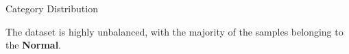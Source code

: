 \documentclass[12pt,aspectratio=169,notheorems]{beamer}
\begin{document}
\begin{frame}{Category Distribution}
    \begin{center}
        \footnotesize The dataset is highly unbalanced, with the majority of the samples belonging to the \textbf{Normal}.
        
        \hspace*{-0.8cm}
        \begin{minipage}[t][6cm][t]{0.5\textwidth}
            \centering
            \vspace{-0.08cm}
            \caption{Counts for each attack category.}
            \label{tab:inverted_attack_categories}


\end{minipage}
\end{center}
\end{frame}
\end{document}
